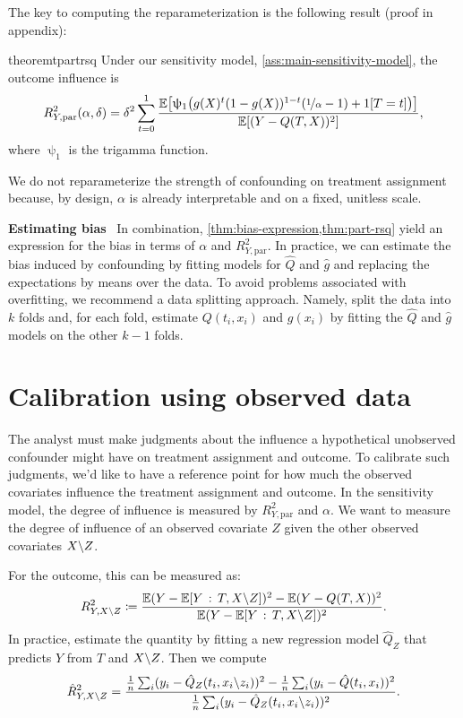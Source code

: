 \documentclass{article}
\DeclareRobustCommand{\parhead}[1]{\textbf{#1}~}
\newcommand{\digammafn}{\uppsi}
\begin{document}
The key to computing the reparameterization is the following result
(proof in appendix):
\begin{restatable}{theorem}{tpartrsq}\label{thm:part-rsq}
  Under our sensitivity model, \cref{ass:main-sensitivity-model},
  the outcome influence is
  \begin{align*}
    R_{Y,\mathrm{par}}^{2}(\alpha,\delta) =
    \delta^{2}\sum_{t=0}^1\frac{ \EE\big[\digammafn_1 \big(g(X)^t(1-g(X))^{1-t}(\nicefrac{1}{\alpha}-1) + 1[T=t]\big)\big]
    }{\EE[(Y-Q(T,X))^{2}]},
    \end{align*}
where $\digammafn_1$ is the trigamma function.
\end{restatable}
%
%
%
%
%
%
%
%
%
%
%
%
%
%
%

%
%
%
%
%
%
%
%
%
%

%
%
%
%
%
%
%
%
%
%
%

We do not reparameterize the strength of confounding
on treatment assignment because, by design, $\alpha$ is already interpretable
and on a fixed, unitless scale.

%
%
%
%
%
%
%
%

\parhead{Estimating bias}
In combination, \cref{thm:bias-expression,thm:part-rsq} yield an expression for the bias in terms of $\alpha$ and $R_{Y,\mathrm{par}}^{2}$.
%
%
%
%
In practice, we can estimate the bias induced by confounding by fitting models for $\hat{Q}$ and $\hat{g}$ and replacing
the expectations by means over the data. To avoid problems associated with overfitting, we recommend a data splitting approach.
Namely, split the data into $k$ folds and, for each fold, estimate $Q(t_i,x_i)$ and $g(x_i)$
by fitting the $\hat{Q}$ and $\hat{g}$ models on the other $k-1$ folds.


\section{Calibration using observed data}
The analyst must make judgments about the influence a hypothetical
unobserved confounder might have on treatment assignment and outcome.
To calibrate such judgments, we'd like to have a reference point
for how much the observed covariates influence the treatment assignment
and outcome. In the sensitivity model, the degree of influence is
measured by $R_{Y,\mathrm{par}}^{2}$ and $\alpha$. We want to measure
the degree of influence of an observed covariate $Z$ given the other
observed covariates $X\backslash Z$.

For the outcome, this can be measured as:
\[
R_{Y,X\exclude Z}^{2}\defeq\frac{\EE(Y-\EE[Y\given T,X\exclude Z])^{2}-\EE(Y-Q(T,X))^{2}}{\EE(Y-\EE[Y\given T,X\exclude Z])^{2}}.
\]
%
%
%
%
In practice, estimate the
quantity by fitting a new regression model $\hat{Q}_{Z}$ that predicts $Y$ from
$T$ and $X\backslash Z$. Then we compute
%
\[
\hat{R}_{Y,X\backslash Z}^{2}=\frac{\frac{1}{n}\sum_i(y_{i}-\hat{Q}_{Z}(t_{i},x_{i}\backslash z_{i}))^{2}-\frac{1}{n}\sum_i(y_{i}-\hat{Q}(t_{i},x_{i}))^{2}}{\frac{1}{n}\sum_i(y_{i}-\hat{Q}_{Z}(t_{i},x_{i}\backslash z_{i}))^{2}}.
\]
\end{document}

